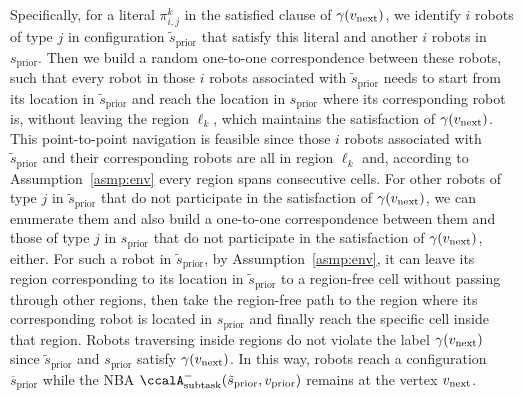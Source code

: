 \documentclass[Afour,sageh,times]{sagej}
\newcommand{\auto}[1]{\ccalA_{\textup{#1}}}
\newcommand{\vertex}[1]{v_{\textup{#1}}}
\renewcommand{\ap}[3]{\mathcal{\pi}_{{#1},{#2}}^{#3}}
\begin{document}
{{Specifically, for a literal $\ap{i}{j}{k}$ in the satisfied clause of $\gamma(\vertex{next})$, we identify $i$ robots of type $j$ in configuration $\tilde{s}_{\text{prior}}$ that satisfy this literal and another  $i$ robots in ${s}_{\text{prior}}$. Then we build a random one-to-one correspondence between these robots, such that every  robot in those $i$ robots associated with $\tilde{s}_{\text{prior}}$ needs to start from its location in $\tilde{s}_{\text{prior}}$ and reach the location in $s_{\text{prior}}$ where its corresponding robot is, without leaving the region $\ell_k$, which maintains the satisfaction of $\gamma(\vertex{next})$. This point-to-point navigation is feasible since those $i$ robots associated with $\tilde{s}_{\text{prior}}$ and their corresponding robots are all in region $\ell_k$ and, according to Assumption~\ref{asmp:env} every region spans consecutive cells. For other robots of type $j$ in $\tilde{s}_{\text{prior}}$ that do not participate in the satisfaction of $\gamma(\vertex{next})$, we can enumerate them and also build a one-to-one correspondence between them and those of type $j$ in $s_{\text{prior}}$ that do not participate in the satisfaction of $\gamma(\vertex{next})$, either. For such a robot in $\tilde{s}_{\text{prior}}$, by Assumption~\ref{asmp:env}, it can leave its region corresponding to its location in $\tilde{s}_\text{prior}$ to a region-free cell without passing through other regions, then take the region-free path to the region where its corresponding robot is located in $s_{\text{prior}}$ and finally reach the specific cell inside that region. Robots traversing inside  regions  do not violate the label $\gamma(\vertex{next})$ since $\tilde{s}_{\text{prior}}$ and $s_{\text{prior}}$ satisfy $\gamma(\vertex{next})$. In this way, robots reach a configuration $\overline{s}_{\text{prior}}$ while the NBA $\auto{subtask}^-( \tilde{s}_{\text{prior}},  {v}_{\text{prior}})$ remains at the vertex $\vertex{next}$.

}}
\end{document}

